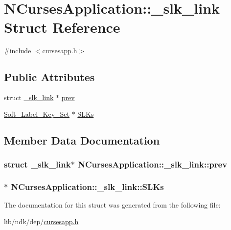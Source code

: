 \hypertarget{struct_n_curses_application_1_1__slk__link}{\section{N\-Curses\-Application\-:\-:\-\_\-slk\-\_\-link Struct Reference}
\label{struct_n_curses_application_1_1__slk__link}
}


{\ttfamily \#include $<$cursesapp.\-h$>$}

\subsection*{Public Attributes}
\begin{DoxyCompactItemize}
\item 
struct \hyperlink{struct_n_curses_application_1_1__slk__link}{\-\_\-slk\-\_\-link} $\ast$ \hyperlink{struct_n_curses_application_1_1__slk__link_ad87ffb171a35200b7a5e8abb51d920d1}{prev}
\item 
\hyperlink{class_soft___label___key___set}{Soft\-\_\-\-Label\-\_\-\-Key\-\_\-\-Set} $\ast$ \hyperlink{struct_n_curses_application_1_1__slk__link_a72fb4e6424f02b737340276ac0cdeba4}{S\-L\-Ks}
\end{DoxyCompactItemize}


\subsection{Member Data Documentation}
\hypertarget{struct_n_curses_application_1_1__slk__link_ad87ffb171a35200b7a5e8abb51d920d1}{
\subsubsection[{prev}]{\setlength{\rightskip}{0pt plus 5cm}struct {\bf \-\_\-slk\-\_\-link}$\ast$ N\-Curses\-Application\-::\-\_\-slk\-\_\-link\-::prev}}\label{struct_n_curses_application_1_1__slk__link_ad87ffb171a35200b7a5e8abb51d920d1}
\hypertarget{struct_n_curses_application_1_1__slk__link_a72fb4e6424f02b737340276ac0cdeba4}{
\subsubsection[{S\-L\-Ks}]{$\ast$ N\-Curses\-Application\-::\-\_\-slk\-\_\-link\-::\-S\-L\-Ks}}\label{struct_n_curses_application_1_1__slk__link_a72fb4e6424f02b737340276ac0cdeba4}


The documentation for this struct was generated from the following file\-:\begin{DoxyCompactItemize}
\item 
lib/ndk/dep/\hyperlink{cursesapp_8h}{cursesapp.\-h}\end{DoxyCompactItemize}
